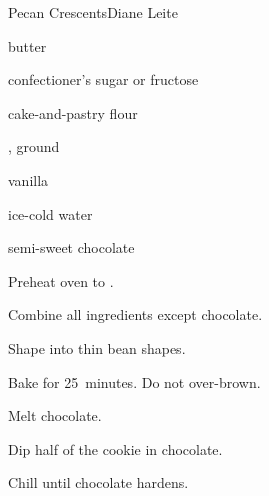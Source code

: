 \begin{recipe}{Pecan Crescents}{Diane Leite}{}

\begin{ingredients}
\item \lbs{\half} butter
\item \C{\half} confectioner's sugar or fructose
\item {} cake-and-pastry flour
\item {} , ground
\item {} vanilla
\item {} ice-cold water
\item semi-sweet chocolate
\end{ingredients}

\begin{directions}
\item Preheat oven to .
\item Combine all ingredients except chocolate.
\item Shape into thin bean shapes.
\item Bake for 25~minutes. Do not over-brown.
\item Melt chocolate.
\item Dip half of the cookie in chocolate.
\item Chill until chocolate hardens.
\end{directions}

\end{recipe}

